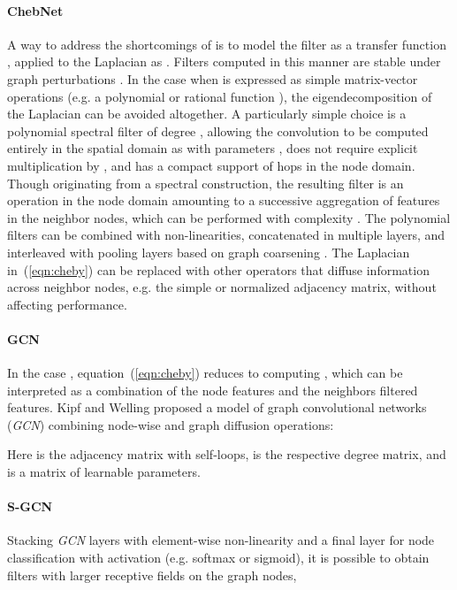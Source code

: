 \documentclass{article}
\begin{document}
\paragraph{ChebNet}
A way to address the shortcomings of \cite{bruna2013spectral} is to model the filter as a transfer function , applied to the Laplacian as . Filters computed in this manner are stable under graph perturbations \cite{levie2019transferability}. 
In the case when  is expressed as simple matrix-vector operations (e.g. a polynomial \cite{defferrard2016convolutional} or rational function \cite{levie2018cayleynets}), the eigendecomposition of the Laplacian  can be avoided altogether. 
A particularly simple choice is a polynomial spectral filter  of degree , allowing the convolution to be computed entirely in the spatial domain as 
\noindent with   parameters , does not require explicit multiplication by , and has a compact support of  hops in the node domain. Though originating from a spectral construction, the resulting filter is an operation in the node domain amounting to a successive aggregation of features in the neighbor nodes,  
which can be performed with complexity  . The polynomial filters can be combined with non-linearities, concatenated in multiple layers, and interleaved with pooling layers based on graph coarsening \cite{defferrard2016convolutional}. 
The Laplacian in~(\ref{eqn:cheby}) can be replaced with other operators that diffuse information across neighbor nodes, e.g. the simple or normalized adjacency matrix, without affecting performance. 

\paragraph{GCN}
In the case , equation~(\ref{eqn:cheby}) reduces to computing , which can be interpreted as a combination of the node features and the neighbors filtered features. 
Kipf and Welling \cite{kipf2016semi} proposed a model of graph convolutional networks (\textit{GCN}) combining node-wise and graph diffusion operations: 

Here  is the adjacency matrix with self-loops,  is the respective degree matrix, and  is a matrix of learnable parameters. 

\paragraph{S-GCN}
Stacking  \textit{GCN} layers with element-wise non-linearity  and a final layer for node classification with activation  (e.g. softmax or sigmoid), it is possible to obtain filters with larger receptive fields on the graph nodes, 
\end{document}

